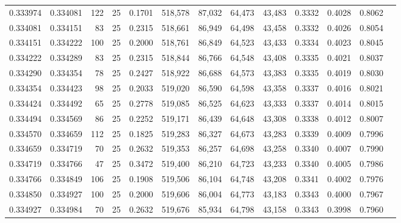 \begin{tabular}{rrrrrrrrrrrrr}
0.333974 & 0.334081 &   122 &  25 &                                     0.1701 & 518,578 &  87,032 &  64,473 &  43,483 & 0.3332 & 0.4028 & 0.8062 \\
0.334081 & 0.334151 &    83 &  25 &                                     0.2315 & 518,661 &  86,949 &  64,498 &  43,458 & 0.3332 & 0.4026 & 0.8054 \\
0.334151 & 0.334222 &   100 &  25 &                                     0.2000 & 518,761 &  86,849 &  64,523 &  43,433 & 0.3334 & 0.4023 & 0.8045 \\
0.334222 & 0.334289 &    83 &  25 &                                     0.2315 & 518,844 &  86,766 &  64,548 &  43,408 & 0.3335 & 0.4021 & 0.8037 \\
0.334290 & 0.334354 &    78 &  25 &                                     0.2427 & 518,922 &  86,688 &  64,573 &  43,383 & 0.3335 & 0.4019 & 0.8030 \\
0.334354 & 0.334423 &    98 &  25 &                                     0.2033 & 519,020 &  86,590 &  64,598 &  43,358 & 0.3337 & 0.4016 & 0.8021 \\
0.334424 & 0.334492 &    65 &  25 &                                     0.2778 & 519,085 &  86,525 &  64,623 &  43,333 & 0.3337 & 0.4014 & 0.8015 \\
0.334494 & 0.334569 &    86 &  25 &                                     0.2252 & 519,171 &  86,439 &  64,648 &  43,308 & 0.3338 & 0.4012 & 0.8007 \\
0.334570 & 0.334659 &   112 &  25 &                                     0.1825 & 519,283 &  86,327 &  64,673 &  43,283 & 0.3339 & 0.4009 & 0.7996 \\
0.334659 & 0.334719 &    70 &  25 &                                     0.2632 & 519,353 &  86,257 &  64,698 &  43,258 & 0.3340 & 0.4007 & 0.7990 \\
0.334719 & 0.334766 &    47 &  25 &                                     0.3472 & 519,400 &  86,210 &  64,723 &  43,233 & 0.3340 & 0.4005 & 0.7986 \\
0.334766 & 0.334849 &   106 &  25 &                                     0.1908 & 519,506 &  86,104 &  64,748 &  43,208 & 0.3341 & 0.4002 & 0.7976 \\
0.334850 & 0.334927 &   100 &  25 &                                     0.2000 & 519,606 &  86,004 &  64,773 &  43,183 & 0.3343 & 0.4000 & 0.7967 \\
0.334927 & 0.334984 &    70 &  25 &                                     0.2632 & 519,676 &  85,934 &  64,798 &  43,158 & 0.3343 & 0.3998 & 0.7960 \\

\end{tabular}
